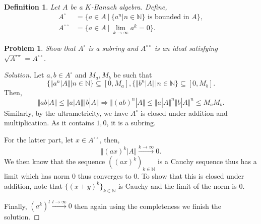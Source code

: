 \documentclass[8pt]{article}
\numberwithin{equation}{section}
\newenvironment{solution}{\begin{proof}[Solution]}{\end{proof}}
\newtheorem{definition}{Definition}[section]
\newtheorem{problem}{Problem}[section]
\newcommand{\norm}[1]{\Vert #1 \Vert}
\newcommand{\N}[0]{\mathbb{N}}
\newcommand{\T}[0]{\mathbb{T}}
\newcommand{\sep}[0]{\:|\:}
\newcommand{\ab}[1]{\vert #1 \vert}
\newcommand{\dcirc}[0]{{\circ\circ}}
\begin{document}
\begin{definition}
  Let $A$ be a $K$-Banach algebra. Define,
  \begin{align*}
    A^\circ &= \{a\in A\sep \{a^n|n\in\N\}\text{ is bounded in $A$}\},\\
    A^\dcirc &= \{a\in A\sep \lim_{k\to\infty}a^k=0\}.
  \end{align*}
\end{definition}
\begin{problem}
  Show that $A^\circ$ is a subring and $A^\dcirc$ is an ideal satisfying $\sqrt{A^\dcirc} = A^\dcirc$.
\end{problem}
\begin{solution}
  Let $a,b\in A^\circ$ and $M_a,M_b$ be such that 
  \begin{equation*}
    \{\norm{a^n|A}|n\in\N\}\subseteq[0,M_a],\{\norm{b^n|A}|n\in\N\}\subseteq[0,M_b].
  \end{equation*}
  Then,
  \begin{equation*}
    \norm{ab|A}\leq \norm{a|A}\norm{b|A}\Rightarrow \norm{(ab)^n|A}\leq\norm{a|A}^n\norm{b|A}^n\leq M_aM_b.
  \end{equation*}
  Similarly, by the ultrametricity, we have $A^\circ$ is closed under addition and multiplication. As it contains $1,0$, it is a subring.
  \par For the latter part, let $x\in A^\dcirc$, then,
  \begin{equation*}
    \norm{(ax)^k|A}\stackrel{k\to\infty}{\to}0.
  \end{equation*}
  We then know that the sequence $((ax)^k)_{k\in\N}$ is a Cauchy sequence thus has a limit which has norm $0$ thus converges to $0$. To show that this is closed under addition, note that $\{(x+y)^k\}_{k\in\N}$ is Cauchy and the limit of the norm is $0$. 
  \par Finally, $(a^k)^l\stackrel{l\to\infty}{\to}0$ then again using the completeness we finish the solution.
\end{solution}
\end{document}
